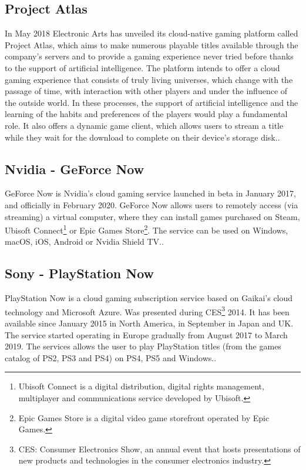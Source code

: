 \subsection{Project Atlas}
In May 2018 Electronic Arts has unveiled its cloud-native gaming platform called Project Atlas, which aims to make numerous playable titles available through the company's servers and to provide a gaming experience never tried before thanks to the support of artificial intelligence. The platform intends to offer a cloud gaming experience that consists of truly living universes, which change with the passage of time, with interaction with other players and under the influence of the outside world. In these processes, the support of artificial intelligence and the learning of the habits and preferences of the players would play a fundamental role. It also offers a dynamic game client, which allows users to stream a title while they wait for the download to complete on their device's storage disk.\cite{Project_Atlas}.

\subsection{Nvidia - GeForce Now}
GeForce Now is Nvidia's cloud gaming service launched in beta in January 2017, and officially in February 2020. GeForce Now allows users to remotely access (via streaming) a virtual computer, where they can install games purchased on Steam, Ubisoft Connect\footnote{Ubisoft Connect is a digital distribution, digital rights management, multiplayer and communications service developed by Ubisoft.} or Epic Games Store\footnote{Epic Games Store is a digital video game storefront operated by Epic Games.}. The service can be used on Windows, macOS, iOS, Android or Nvidia Shield TV.\cite{GeForce_Now}.

\subsection{Sony - PlayStation Now}
PlayStation Now is a cloud gaming subscription service based on Gaikai's cloud technology and Microsoft Azure. Was presented during CES\footnote{CES: Consumer Electronics Show, an annual event that hosts presentations of new products and technologies in the consumer electronics industry.} 2014. It has been available since January 2015 in North America, in September in Japan and UK. The service started operating in Europe gradually from August 2017 to March 2019. The services allows the user to play PlayStation titles (from the games catalog of PS2, PS3 and PS4) on PS4, PS5 and Windows.\cite{PlayStation_Now}.

